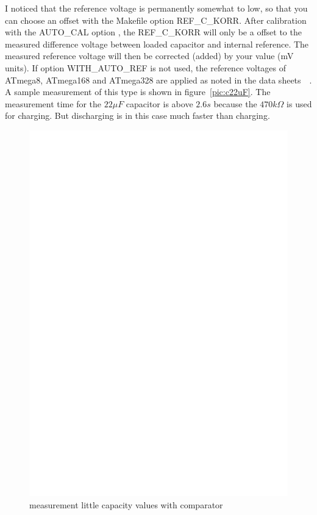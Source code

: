 I noticed that the reference voltage is permanently somewhat to low,
 so that you can choose an offset with the Makefile option REF\_C\_KORR.
After calibration with the AUTO\_CAL option , the REF\_C\_KORR will only be a offset to the measured difference voltage
between loaded capacitor and internal reference.
The measured reference voltage will then be corrected (added) by your value (mV units).
If option WITH\_AUTO\_REF is not used, the reference voltages of ATmega8, ATmega168 and ATmega328
are applied as noted in the data sheets~\cite{ATmega8}~\cite{ATmega168}. 
A sample measurement of this type is shown in figure~\ref{pic:c22uF}.
The measurement time for the \(22\mu F\) capacitor is above \(2.6s\) because the \(470k\Omega\) is
used for charging. But discharging is in this case much faster than charging.

\begin{figure}[H]
\centering
\includegraphics[]{../FIG/Comparat.eps}
\caption{measurement little capacity values with comparator}
\label{fig:comparat}
\end{figure}

